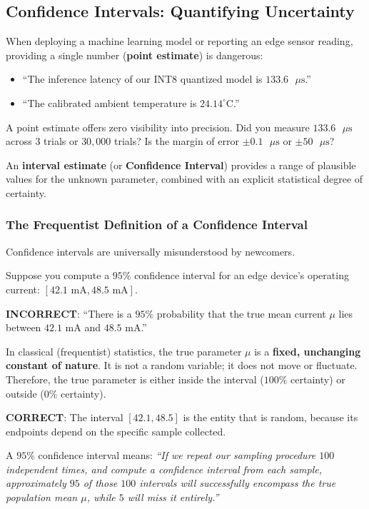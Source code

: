 \subsection{Confidence Intervals: Quantifying Uncertainty}\label{subsec:stat_confidence_intervals}

When deploying a machine learning model or reporting an edge sensor reading, providing a single number (\textbf{point estimate}) is dangerous:
\begin{itemize}
    \item ``The inference latency of our INT8 quantized model is $133.6\text{ }\mu\text{s}$.''
    \item ``The calibrated ambient temperature is $24.14^\circ\text{C}$.''
\end{itemize}
A point estimate offers zero visibility into precision. Did you measure $133.6\text{ }\mu\text{s}$ across $3$ trials or $30{,}000$ trials? Is the margin of error $\pm 0.1\text{ }\mu\text{s}$ or $\pm 50\text{ }\mu\text{s}$?

An \textbf{interval estimate} (or \textbf{Confidence Interval}) provides a range of plausible values for the unknown parameter, combined with an explicit statistical degree of certainty.

\subsubsection{The Frequentist Definition of a Confidence Interval}
Confidence intervals are universally misunderstood by newcomers. 

\begin{warning}
Suppose you compute a $95\%$ confidence interval for an edge device's operating current: $[42.1\text{ mA}, 48.5\text{ mA}]$.
\begin{center}
\textbf{INCORRECT}: ``There is a $95\%$ probability that the true mean current $\mu$ lies between $42.1\text{ mA}$ and $48.5\text{ mA}$.''
\end{center}
In classical (frequentist) statistics, the true parameter $\mu$ is a \textbf{fixed, unchanging constant of nature}. It is not a random variable; it does not move or fluctuate. Therefore, the true parameter is either inside the interval ($100\%$ certainty) or outside ($0\%$ certainty).

\textbf{CORRECT}: The interval $[42.1, 48.5]$ is the entity that is random, because its endpoints depend on the specific sample collected. 

A $95\%$ confidence interval means: \textit{``If we repeat our sampling procedure $100$ independent times, and compute a confidence interval from each sample, approximately $95$ of those $100$ intervals will successfully encompass the true population mean $\mu$, while $5$ will miss it entirely.''}
\end{warning}

